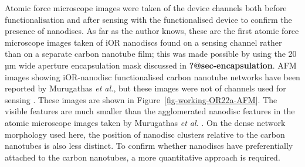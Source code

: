 \documentclass[
  a4paper,
]{scrbook}
\begin{document}
Atomic force microscope images were taken of the device channels both
before functionalisation and after sensing with the functionalised
device to confirm the presence of nanodiscs. As far as the author knows,
these are the first atomic force microscope images taken of iOR
nanodiscs found on a sensing channel rather than on a separate carbon
nanotube film; this was made possible by using the 20 µm wide aperture
encapsulation mask discussed in \textbf{?@sec-encapsulation}. AFM images
showing iOR-nanodisc functionalised carbon nanotube networks have been
reported by Murugathas \emph{et al.}, but these images were not of
channels used for sensing \autocite{Murugathas2019b}. These images are
shown in Figure~\ref{fig-working-OR22a-AFM}. The visible features are
much smaller than the agglomerated nanodisc features in the atomic
microscope images taken by Murugathas \emph{et al.}
\autocite{Murugathas2019b}. On the dense network morphology used here,
the position of nanodisc clusters relative to the carbon nanotubes is
also less distinct. To confirm whether nanodiscs have preferentially
attached to the carbon nanotubes, a more quantitative approach is
required.
\end{document}

